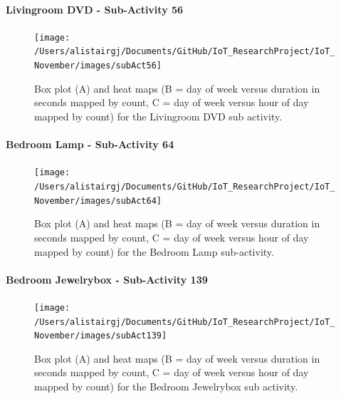 \documentclass[11pt,]{article}
\let\oldparagraph\paragraph
\renewcommand{\paragraph}[1]{\oldparagraph{#1}\mbox{}}
\begin{document}
\hypertarget{livingroom-dvd---sub-activity-56}{%
\paragraph{Livingroom DVD - Sub-Activity
56}\label{livingroom-dvd---sub-activity-56}}

\begin{figure}[H]

{\centering \texttt{[image: /Users/alistairgj/Documents/GitHub/IoT\_ResearchProject/IoT\_November/images/subAct56]} 

}

\caption{Box plot (A) and heat maps (B = day of week versus duration in seconds mapped by count, C = day of week versus hour of day mapped by count) for the Livingroom DVD sub activity.}\label{fig:subAct56}
\end{figure}

\hypertarget{bedroom-lamp---sub-activity-64}{%
\paragraph{Bedroom Lamp - Sub-Activity
64}\label{bedroom-lamp---sub-activity-64}}

\begin{figure}[H]

{\centering \texttt{[image: /Users/alistairgj/Documents/GitHub/IoT\_ResearchProject/IoT\_November/images/subAct64]} 

}

\caption{Box plot (A) and heat maps (B = day of week versus duration in seconds mapped by count, C = day of week versus hour of day mapped by count) for the Bedroom Lamp sub-activity.}\label{fig:subAct64}
\end{figure}

\hypertarget{bedroom-jewelrybox---sub-activity-139}{%
\paragraph{Bedroom Jewelrybox - Sub-Activity
139}\label{bedroom-jewelrybox---sub-activity-139}}

\begin{figure}[H]

{\centering \texttt{[image: /Users/alistairgj/Documents/GitHub/IoT\_ResearchProject/IoT\_November/images/subAct139]} 

}

\caption{Box plot (A) and heat maps (B = day of week versus duration in seconds mapped by count, C = day of week versus hour of day mapped by count) for the Bedroom Jewelrybox sub activity.}\label{fig:subAct139}
\end{figure}
\end{document}
